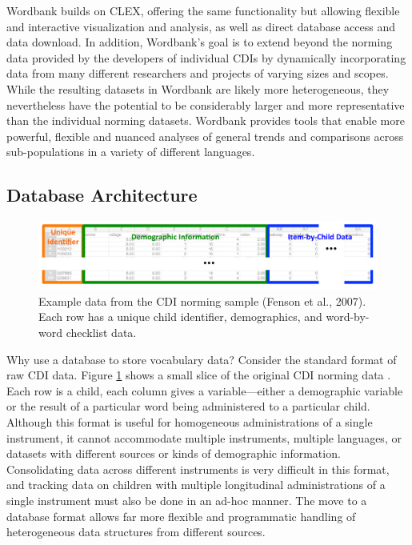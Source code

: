 \documentclass[man,noapacite]{apa}
\begin{document}
Wordbank builds on CLEX, offering the same functionality but allowing flexible and interactive visualization and analysis, as well as direct database access and data download. In addition, Wordbank's goal is to extend beyond the norming data provided by the developers of individual CDIs by dynamically incorporating data from many different researchers and projects of varying sizes and scopes.  While the resulting datasets in Wordbank are likely more heterogeneous, they nevertheless have the potential to be considerably larger and more representative than the individual norming datasets.  Wordbank provides tools that enable more powerful, flexible and nuanced analyses of general trends and comparisons across sub-populations in a variety of different languages.

\subsection{Database Architecture}

\begin{figure}[t]
\centering
\includegraphics[width=5in]{figures/itembychild.pdf}
\caption{\label{fig:data} Example data from the CDI norming sample (Fenson et al., 2007). Each row has a unique child identifier, demographics, and word-by-word checklist data. }
\end{figure}

Why use a database to store vocabulary data? Consider the standard format of raw CDI data. Figure \ref{fig:data} shows a small slice of the original CDI norming data \cite{fenson1994,fenson2007}. Each row is a child, each column gives a variable---either a demographic variable or the result of a particular word being administered to a particular child. Although this format is useful for homogeneous administrations of a single instrument, it cannot accommodate multiple instruments, multiple languages, or datasets with different sources or kinds of demographic information. Consolidating data across different instruments is very difficult in this format, and tracking data on children with multiple longitudinal administrations of a single instrument must also be done in an ad-hoc manner. The move to a database format allows far more flexible and programmatic handling of heterogeneous data structures from different sources. 
\end{document}
